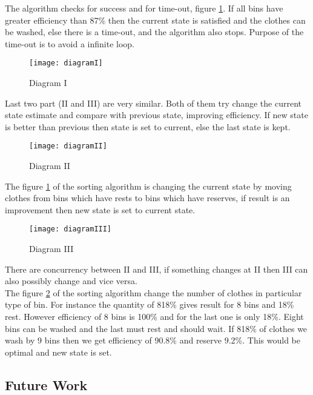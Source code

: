 The algorithm checks for success and for time-out, figure \ref{fig:diagramI}. If all bins have greater efficiency than 87\% then the current state is satisfied and the clothes can be washed, else there is a time-out, and the algorithm also stops. Purpose of the time-out is to avoid a infinite loop.

\begin{figure}[h]
	\centering
		\texttt{[image: diagramI]}
	\caption{Diagram I}
	\label{fig:diagramI}
\end{figure}

Last two part (II and III) are very similar. Both of them try change the current state estimate and compare with previous state, improving efficiency. If new state is better than previous then state is set to current, else the last state is kept.  \newpage

\begin{figure}[h]
	\centering
		\texttt{[image: diagramII]}
	\caption{Diagram II}
	\label{fig:diagramII}
\end{figure}

The figure \ref{fig:diagramI} of the sorting algorithm is changing the current state by moving clothes from bins which have rests to bins which have reserves, if result is an improvement then new state is set to current state. 

\begin{figure}[h]
	\centering
		\texttt{[image: diagramIII]}
	\caption{Diagram III}
	\label{fig:diagramIII}
\end{figure}
There are concurrency between II and III, if something changes at II then III can also possibly change and vice versa.
\\
The figure \ref{fig:diagramII} of the sorting algorithm change the number of clothes in particular type of bin. For instance the quantity of 818\% gives result for 8 bins and 18\% rest. However efficiency of 8 bins is 100\% and for the last one is only 18\%. Eight bins can be washed and the last must rest and should wait. If 818\% of clothes we wash by 9 bins then we get efficiency of 90.8\% and reserve 9.2\%. This would be optimal and new state is set.

\subsection{Future Work}
